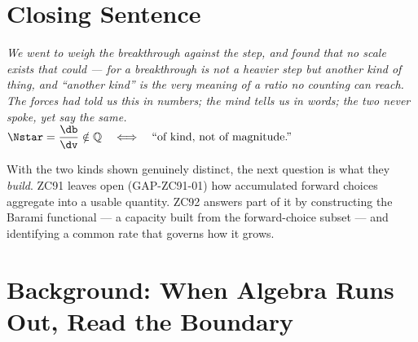 \documentclass[12pt, a4paper]{article}
\begin{document}
\section{Closing Sentence}

\bigskip
\begin{center}
\textit{%
  We went to weigh the breakthrough against the step, and found that no
  scale exists that could --- for a breakthrough is not a heavier step but
  another kind of thing, and ``another kind'' is the very meaning of a
  ratio no counting can reach.\\[0.3em]
  The forces had told us this in numbers; the mind tells us in words; the
  two never spoke, yet say the same.\\[0.5em]
  $\displaystyle \Nstar=\frac{\db}{\dv}\notin\mathbb{Q}
  \quad\Longleftrightarrow\quad
  \text{``of kind, not of magnitude.''}$
}
\end{center}



\noindent
With the two kinds shown genuinely distinct, the next question is what they
\emph{build}. ZC91 leaves open (GAP-ZC91-01) how accumulated forward choices
aggregate into a usable quantity. ZC92 answers part of it by constructing the
Barami functional --- a capacity built from the forward-choice subset --- and
identifying a common rate that governs how it grows.
\section{Background: When Algebra Runs Out, Read the Boundary}
\label{sec:background-zc92}
\end{document}
